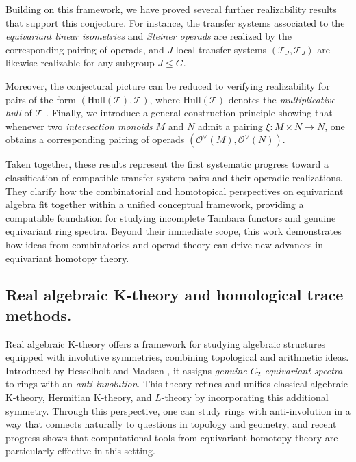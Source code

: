 \documentclass[11pt]{article}
\begin{document}
Building on this framework, we have proved several further realizability results that support this conjecture.
For instance, the transfer systems associated to the {\it equivariant linear isometries} and {\it Steiner operads} are realized by the corresponding pairing of operads, and $J$-local transfer systems $(\mathcal{T}_J,\mathcal{T}_J)$ are likewise realizable for any subgroup $J\le G$.


Moreover, the conjectural picture can be reduced to verifying realizability for pairs of the form $(\mathrm{Hull}(\mathcal{T}),\mathcal{T})$, where $\mathrm{Hull}(\mathcal{T})$ denotes the {\it multiplicative hull} of $\mathcal{T}$ \cite[7.84]{MR4327103}.
Finally, we introduce a general construction principle showing that whenever two {\it intersection monoids} $M$ and $N$ admit a pairing $\xi\colon M\times N\to N$, one obtains a corresponding pairing of operads $(\mathcal{O}^{\vee}(M),\mathcal{O}^{\vee}(N))$.

Taken together, these results represent the first systematic progress toward a classification of compatible transfer system pairs and their operadic realizations.
They clarify how the combinatorial and homotopical perspectives on equivariant algebra fit together within a unified conceptual framework, providing a computable foundation for studying incomplete Tambara functors and genuine equivariant ring spectra.
Beyond their immediate scope, this work demonstrates how ideas from combinatorics and operad theory can drive new advances in equivariant homotopy theory.


\subsection{Real algebraic K-theory and homological trace methods.}
Real algebraic K-theory offers a framework for studying algebraic structures equipped with involutive symmetries, combining topological and arithmetic ideas.
Introduced by Hesselholt and Madsen \cite{HMreal}, it assigns {\it genuine $C_2$-equivariant spectra} to rings with an {\it anti-involution}.
This theory refines and unifies classical algebraic K-theory, Hermitian K-theory, and $L$-theory by incorporating this additional symmetry.
Through this perspective, one can study rings with anti-involution in a way that connects naturally to questions in topology and geometry, and recent progress shows that computational tools from equivariant homotopy theory are particularly effective in this setting.
\end{document}
